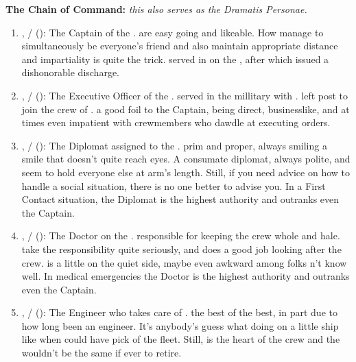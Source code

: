 \documentclass[blue]{TMFHope}
\begin{document}
{\bf The \pNew{} Chain of Command:} \emph{this also serves as the Dramatis Personae.}
\begin{enumerate}
  \item \cCap{\full}, \cCap{\they}/\cCap{\them} (\cCap{\MYplayer}): The Captain of the \pNew{}. \cCap{\Theyare} are easy going and likeable. How \cCap{\they} manage\cCap{\plural} to simultaneously be everyone's friend and also maintain appropriate distance and impartiality is quite the trick. \cCap{\They} served in \pBattle{} on the \pOld{}, after which \cCap{\theywere} issued a dishonorable discharge.
  
  \item \cXO{\full}, \cXO{\they}/\cXO{\them} (\cXO{\MYplayer}): The Executive Officer of the \pNew{}. \cXO served in the \pPlan{} millitary with \cCap{}. \cXO{\They} left \cXO{\their} post to join the crew of \pNew{}. \cXO{\Theyare} a good foil to the Captain, being direct, businesslike, and at times even impatient with crewmembers who dawdle at executing orders.
  
  \item \cDip{\full}, \cDip{\they}/\cDip{\them} (\cDip{\MYplayer}): The Diplomat assigned to the \pNew{}. \cDip{\Theyare} prim and proper, always smiling a smile that doesn't quite reach \cDip{\their} eyes. A consumate diplomat, \cDip{\theyare} always polite, and seem\cDip{\plural} to hold everyone else at arm's length. Still, if you need advice on how to handle a social situation, there is no one better to advise you. In a First Contact situation, the Diplomat is the highest authority and outranks even the Captain.
  
  \item \cMed{\full}, \cMed{\they}/\cMed{\them} (\cMed{\MYplayer}): The Doctor on the  \pNew{}. \cMed{\Theyare} responsible for keeping the crew whole and hale. \cMed{\They} take the responsibility quite seriously, and does a good job looking after the crew. \cMed{} is a little on the quiet side, maybe even awkward among folks \cMed{\theydo}n't know well. In medical emergencies the Doctor is the highest authority and outranks even the Captain.
  
  \item \cEng{\full}, \cEng{\they}/\cEng{\them} (\cEng{\MYplayer}): The Engineer who takes care of \pNew{}. \cEng{\Theyare} the best of the best, in part due to how long \cEng{\theyhave} been an engineer. It's anybody's guess what \cEng{\theyare} doing on a little ship like \pNew{} when \cEng{\they} could have \cEng{\their} pick of the fleet. Still, \cEng{} is the heart of the crew and the \pNew{} wouldn't be the same if \cEng{\theywere} ever to retire.
  

\end{enumerate}
\end{document}
